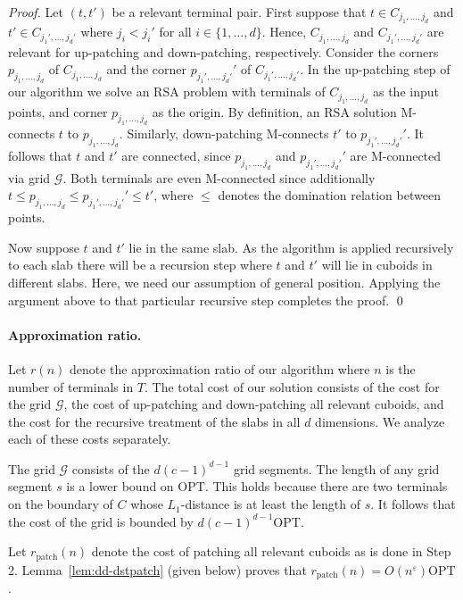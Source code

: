 \documentclass[11pt]{llncs}
\newcommand{\eps}{\ensuremath{\varepsilon}\xspace}
\newcommand{\opt}{\ensuremath{\mathrm{OPT}}\xspace}
\newenvironment{pf}{\begin{proof}}{\qed\end{proof}}
\begin{document}
\begin{pf} 
  Let $(t,t')$ be a relevant terminal pair.  First suppose that $t\in
  C_{j_1,\dots,j_d}$ and $t'\in C_{j_1',\dots,j_d'}$ where $j_i<j_i'$
  for all $i\in\{1,\dots,d\}$.  Hence, $C_{j_1,\dots,j_d}$ and
  $C_{j_1',\dots,j_d'}$ are relevant for up-patching and
  down-patching, respectively.  Consider the corners
  $p_{j_1,\dots,j_d}$ of $C_{j_1,\dots,j_d}$ and the corner
  $p_{j_1',\dots,j_d'}'$ of $C_{j_1',\dots,j_d'}$. In the up-patching
  step of our algorithm we solve an RSA problem with terminals of
  $C_{j_1,\dots,j_d}$ as the input points, and corner
  $p_{j_1,\dots,j_d}$ as the origin. By definition, an RSA solution
  M-connects $t$ to $p_{j_1,\dots,j_d}$.  Similarly, down-patching
  M-connects $t'$ to $p_{j_1',\dots,j_d'}'$.  It follows that $t$ and
  $t'$ are connected, since $p_{j_1,\dots,j_d}$ and
  $p_{j_1',\dots,j_d'}'$ are M-connected via grid $\mathcal G$.  Both
  terminals are even M-connected since additionally $t\leq
  p_{j_1,\dots,j_d}\leq p_{j_1',\dots,j_d'}'\leq t'$, where $\leq$
  denotes the domination relation between points.

  Now suppose $t$ and $t'$ lie in the same slab. As the algorithm is
  applied recursively to each slab there will be a recursion step
  where $t$ and $t'$ will lie in cuboids in different slabs. Here, we
  need our assumption of general position. Applying the argument above
  to that particular recursive step completes the proof.
\end{pf}

\paragraph{Approximation ratio.}

Let $r(n)$ denote the approximation ratio of our algorithm where $n$
is the number of terminals in $T$.  The total cost of our solution
consists of the cost for the grid $\mathcal G$, the cost of
up-patching and down-patching all relevant cuboids, and the cost for
the recursive treatment of the slabs in all $d$ dimensions.  We
analyze each of these costs separately.

The grid $\mathcal G$ consists of the $d(c-1)^{d-1}$ grid segments.  The
length of any grid segment $s$ is a lower bound on $\opt$.  This holds
because there are two terminals on the boundary of $C$ whose
$L_1$-distance is at least the length of $s$.
It follows that the cost of the grid is bounded by $d(c-1)^{d-1}\opt$.

Let $r_{\text{patch}}(n)$ denote the cost of patching all relevant
cuboids as is done in Step 2. Lemma~\ref{lem:dd-dstpatch} (given
below) proves that $r_{\text{patch}}(n) = O(n^{\eps})\opt$.
\end{document}
